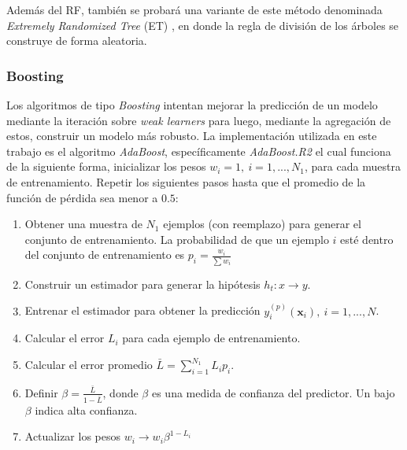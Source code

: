 \documentclass[spanish]{article}
\begin{document}
          Además del RF, también se probará una variante de este método denominada 
          \emph{Extremely Randomized Tree} (ET) \cite{geurts2006extremely}, en donde la regla de división de los árboles se 
          construye de forma aleatoria.%

                        
        \subsubsection{Boosting}
            
          Los algoritmos de tipo \emph{Boosting} \cite{freund1997decision} intentan mejorar la predicción de un modelo mediante 
          la iteración sobre \emph{weak learners} para luego, mediante la agregación de estos, construir 
          un modelo más robusto. La implementación utilizada en este trabajo es el algoritmo \emph{AdaBoost}, 
          específicamente \emph{AdaBoost.R2} \cite{drucker1997improving} el cual funciona de la siguiente 
          forma, inicializar los pesos $w_i=1, ~ i=1,...,N_1$, para cada muestra de entrenamiento. 
          Repetir los siguientes pasos hasta que el promedio de la función de pérdida sea menor a $0.5$:
          \begin{enumerate}
            \item Obtener una muestra de $N_1$ ejemplos (con reemplazo) para generar el conjunto de 
              entrenamiento. La probabilidad de que un ejemplo $i$ esté dentro del conjunto de entrenamiento 
              es $p_i=\frac{w_i}{\sum w_i}$
            \item Construir un estimador para generar la hipótesis $h_t: x \rightarrow y$.
            \item Entrenar el estimador para obtener la predicción $y_i^{(p)}(\textbf{x}_i), ~ i=1, ..., N$.
            \item Calcular el error $L_i$ para cada ejemplo de entrenamiento.
            \item Calcular el error promedio $\bar{L}=\sum_{i=1}^{N_1}L_ip_i$.
            \item Definir $\beta=\frac{\bar{L}}{1-\bar{L}}$, donde $\beta$ es una medida de confianza del 
              predictor. Un bajo $\beta$ indica alta confianza.
            \item Actualizar los pesos $w_i\rightarrow w_i\beta^{1-L_i}$
          \end{enumerate}
            
\end{document}
